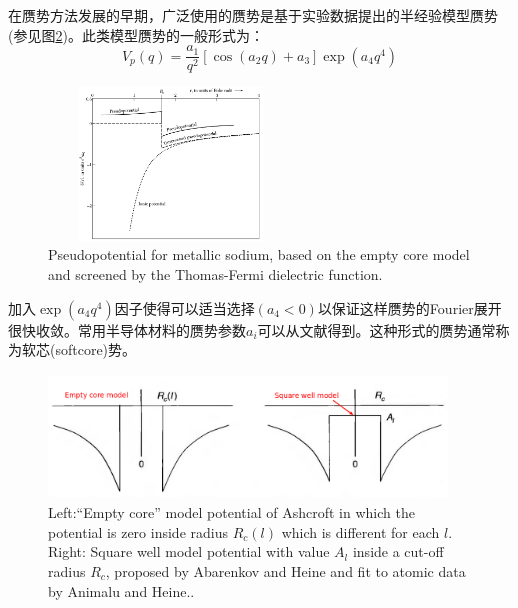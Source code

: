 {在赝势方法发展的早期，广泛使用的赝势是基于实验数据提出的半经验模型赝势%
(参见图\ref{Pseudo-model})。此类模型赝势的一般形式为：
\begin{equation}
  V_p(q)=\frac{a_1}{q^2}[\cos(a_2q)+a_3]\exp(a_4q^4)
  \label{eq:solid-102}
\end{equation}
\begin{figure}[h!]
\centering
\includegraphics[height=1.60in,width=2.57in,viewport=0 0 980 600,clip]{Figures/Pseudo-model-empty_core.png}
\caption{\small \textrm{Pseudopotential for metallic sodium, based on the empty core model and screened by the Thomas-Fermi dielectric function.}}%
\label{Pseudo_model-empty_core}
\end{figure}
加入$\exp(a_4q^4)$因子使得可以适当选择$(a_4<0)$以保证这样赝势的Fourier展开很快收敛。常用半导体材料的赝势参数$a_i$可以从文献得到。这种形式的赝势通常称为软芯(softcore)势。%
\begin{figure}[h!]
\centering
\includegraphics[height=1.30in,width=4.17in,viewport=0 0 1150 350,clip]{Figures/Pseudo-model.png}
\caption{\small \textrm{Left:``Empty core'' model potential of Ashcroft in which the potential is zero inside radius $R_c(l)$ which is different for each $l$. Right: Square well model potential with value $A_l$ inside a cut-off radius $R_c$, proposed by Abarenkov and Heine and fit to atomic data by Animalu and Heine..}}%
\label{Pseudo-model}
\end{figure}

}
